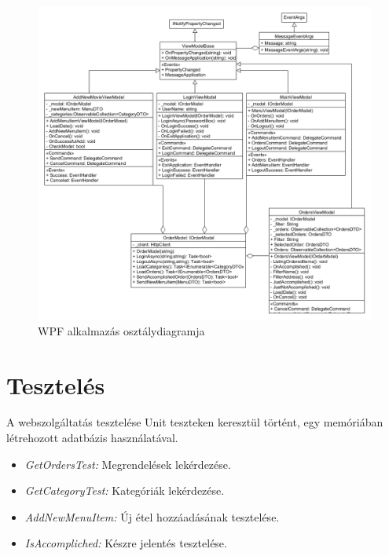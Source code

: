 \documentclass[11pt,a4paper]{article}
\begin{document}
\begin{figure}[h]
	\centering
	\includegraphics[width=16cm]{uml/ClassDiagram.png}
	\caption{WPF alkalmazás osztálydiagramja}
\end{figure}

\section{Tesztelés}
A webszolgáltatás tesztelése Unit teszteken keresztül történt, egy memóriában létrehozott adatbázis használatával.
\begin{itemize}
\item\textit{GetOrdersTest:} Megrendelések lekérdezése.
\item\textit{GetCategoryTest:} Kategóriák lekérdezése.
\item\textit{AddNewMenuItem:} Új étel hozzáadásának tesztelése.
\item\textit{IsAccompliched:} Készre jelentés tesztelése. 
\end{itemize}
\end{document}
